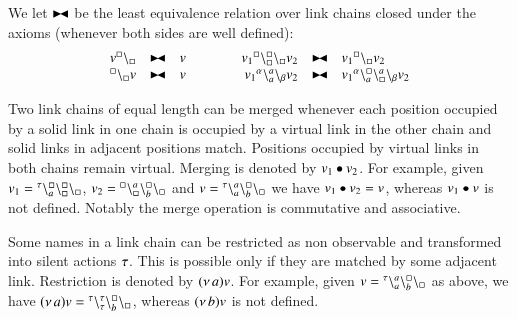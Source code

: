 \begin{definition}\label{def:black}
We let $\blackstretcheq$ be the least equivalence relation 
over link chains closed under the axioms (whenever both sides are well defined):
\[
\begin{array}{rclcrcl}
v\link{\noact}{\noact} & \blackstretcheq &  v & \qquad &
v_1 \startchain{\noact}\chainedlink{\noact}{\noact}\chainend{\noact}v_2 & \blackstretcheq & v_1 \link{\noact}{\noact} v_2\\
\link{\noact}{\noact}v & \blackstretcheq & v & &
v_1 \startchain{\alpha}\chainedlink{a}{a}\chainend{\beta} v_2
& \blackstretcheq & 
v_1 \startchain{\alpha}\chainedlink{a}{\noact}\chainedlink{\noact}{a}\chainend{\beta}v_2 
\end{array}
\]
\end{definition}

Two link chains of equal length can be merged whenever each position occupied by a solid link in one chain is occupied by a virtual link in the other chain and solid links in adjacent positions match. Positions occupied by virtual links in both chains remain virtual. Merging is denoted by $v_1 \bullet v_2$.
%
For example, given $v_1 = {}^{\tau}\backslash_{a}^{\scriptstyle {\square}}\backslash_{\scriptstyle {\square}}^{\scriptstyle {\square}}\backslash_{\scriptstyle {\square}}$, $v_2 = {}^{\scriptstyle {\square}}\backslash_{\scriptstyle {\square}}^{a}\backslash_{b}^{\scriptstyle {\square}}\backslash_{\scriptstyle {\square}}$ and $v = {}^{\tau}\backslash_{a}^{a}\backslash_{b}^{\scriptstyle {\square}}\backslash_{\scriptstyle {\square}}$
we have $v_1 \bullet v_2 = v$, whereas $v_1 \bullet v$ is not defined. Notably the merge operation is commutative and associative.

Some names in a link chain can be restricted as non observable and transformed into silent actions $\tau$. This is possible only if they are matched by some adjacent link. Restriction is denoted by $(\nu\, a)v$.
%
For example, given $v = {}^{\tau}\backslash_{a}^{a}\backslash_{b}^{\scriptstyle {\square}}\backslash_{\scriptstyle {\square}}$ as above, we have 
$(\nu\, a)v = {}^{\tau}\backslash_{\tau}^{\tau}\backslash_{b}^{\scriptstyle {\square}}\backslash_{\scriptstyle {\square}}$,
whereas $(\nu\, b)v$ is not defined.

